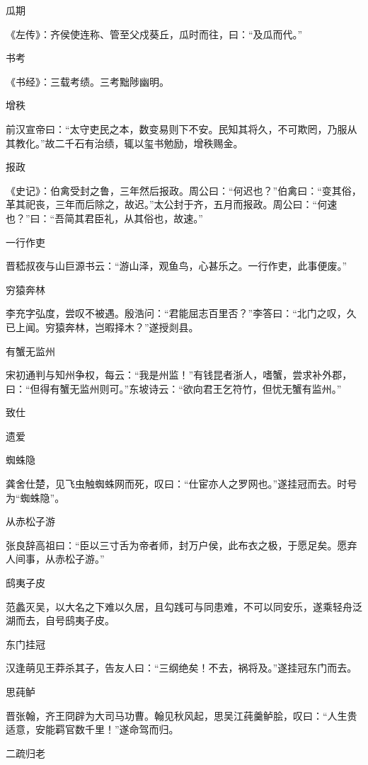 \documentclass[a4paper,12pt,UTF8,twoside]{ctexbook}
\begin{document}
    瓜期
    
    《左传》：齐侯使连称、管至父戍葵丘，瓜时而往，曰：“及瓜而代。”
    
    书考
    
    《书经》：三载考绩。三考黜陟幽明。
    
    增秩
    
    前汉宣帝曰：“太守吏民之本，数变易则下不安。民知其将久，不可欺罔，乃服从其教化。”故二千石有治绩，辄以玺书勉励，增秩赐金。
    
    报政
    
    《史记》：伯禽受封之鲁，三年然后报政。周公曰：“何迟也？”伯禽曰：“变其俗，革其祀丧，三年而后除之，故迟。”太公封于齐，五月而报政。周公曰：“何速也？”曰：“吾简其君臣礼，从其俗也，故速。”
    
    一行作吏
    
    晋嵇叔夜与山巨源书云：“游山泽，观鱼鸟，心甚乐之。一行作吏，此事便废。”
    
    穷猿奔林
    
    李充字弘度，尝叹不被遇。殷浩问：“君能屈志百里否？”李答曰：“北门之叹，久已上闻。穷猿奔林，岂暇择木？”遂授剡县。
    
    有蟹无监州
    
    宋初通判与知州争权，每云：“我是州监！”有钱昆者浙人，嗜蟹，尝求补外郡，曰：“但得有蟹无监州则可。”东坡诗云：“欲向君王乞符竹，但忧无蟹有监州。”
    
    致仕
    
    遗爱
    
    蜘蛛隐
    
    龚舍仕楚，见飞虫触蜘蛛网而死，叹曰：“仕宦亦人之罗网也。”遂挂冠而去。时号为“蜘蛛隐”。
    
    从赤松子游
    
    张良辞高祖曰：“臣以三寸舌为帝者师，封万户侯，此布衣之极，于愿足矣。愿弃人间事，从赤松子游。”
    
    鸱夷子皮
    
    范蠡灭吴，以大名之下难以久居，且勾践可与同患难，不可以同安乐，遂乘轻舟泛湖而去，自号鸱夷子皮。
    
    东门挂冠
    
    汉逢萌见王莽杀其子，告友人曰：“三纲绝矣！不去，祸将及。”遂挂冠东门而去。
    
    思莼鲈
    
    晋张翰，齐王冏辟为大司马功曹。翰见秋风起，思吴江莼羹鲈脍，叹曰：“人生贵适意，安能羁官数千里！”遂命驾而归。
    
    二疏归老
    
\end{document}
